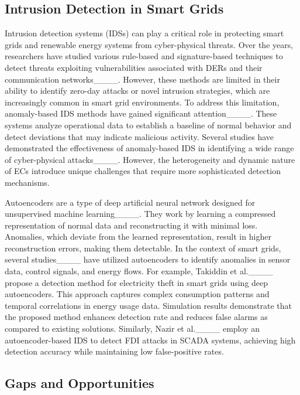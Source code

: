 

\subsection{Intrusion Detection in Smart Grids} 
Intrusion detection systems (IDSs) can play a critical role in protecting smart grids and renewable energy systems from cyber-physical threats. Over the years, researchers have studied various rule-based and signature-based techniques to detect threats exploiting vulnerabilities associated with DERs and their communication networks____. However, these methods are limited in their ability to identify zero-day attacks or novel intrusion strategies, which are increasingly common in smart grid environments. To address this limitation, anomaly-based IDS methods have gained significant attention____. These systems analyze operational data to establish a baseline of normal behavior and detect deviations that may indicate malicious activity. Several studies have demonstrated the effectiveness of anomaly-based IDS in identifying a wide range of cyber-physical attacks____. However, the heterogeneity and dynamic nature of ECs introduce unique challenges that require more sophisticated detection mechanisms.

Autoencoders are a type of deep artificial neural network designed for unsupervised machine learning____. They work by learning a compressed representation of normal data and reconstructing it with minimal loss. Anomalies, which deviate from the learned representation, result in higher reconstruction errors, making them detectable. In the context of smart grids, several studies____ have utilized autoencoders to identify anomalies in sensor data, control signals, and energy flows. For example, Takiddin et al.____ propose a detection method for electricity theft in smart grids using deep autoencoders. This approach captures complex consumption patterns and temporal correlations in energy usage data. Simulation results demonstrate that the proposed method enhances detection rate and reduces false alarms as compared to existing solutions. Similarly, Nazir et al.____ employ an autoencoder-based IDS to detect FDI attacks in SCADA systems, achieving high detection accuracy while maintaining low false-positive rates. 

\subsection{Gaps and Opportunities}

